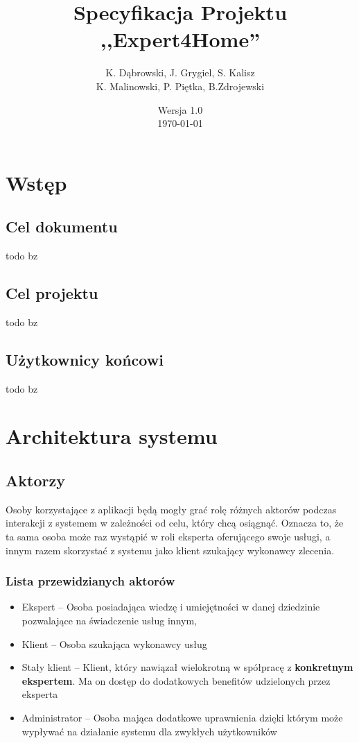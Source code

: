 \documentclass[10pt, titlepage, oneside, a4paper]{article}
\title{Specyfikacja Projektu ,,Expert4Home''}
\author{K. Dąbrowski, J. Grygiel, S. Kalisz\\
K. Malinowski, P. Piętka, B.Zdrojewski}
\date{Wersja 1.0\\\today}
\begin{document}
	\maketitle
	\thispagestyle{empty}  
	\newpage
  
	\section{Wstęp} 
  
	\subsection{Cel dokumentu}
	todo bz
  
	\subsection{Cel projektu}
	todo bz
  
	\subsection{Użytkownicy końcowi}
	todo bz
  
	\section{Architektura systemu}
  
  \subsection{Aktorzy}
	Osoby korzystające z aplikacji będą mogły grać rolę różnych aktorów podczas interakcji z systemem w zależności od celu, który chcą osiągnąć.
	Oznacza to, że ta sama osoba może raz wystąpić w roli eksperta oferującego swoje usługi, a innym razem skorzystać z systemu jako klient szukający wykonawcy zlecenia.

	\subsubsection*{Lista przewidzianych aktorów}
	\begin{itemize}
		\item Ekspert -- Osoba posiadająca wiedzę i umiejętności w danej dziedzinie pozwalające na świadczenie usług innym,
		\item Klient -- Osoba szukająca wykonawcy usług
		\item Stały klient -- Klient, który nawiązał wielokrotną w spółpracę z \textbf{konkretnym ekspertem}. Ma on dostęp do dodatkowych benefitów udzielonych przez eksperta
		\item Administrator -- Osoba mająca dodatkowe uprawnienia dzięki którym może wypływać na działanie systemu dla zwykłych użytkowników
	\end{itemize}
	
\end{document}
